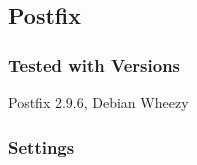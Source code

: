 \subsection{Postfix}

\subsubsection{Tested with Versions}
\begin{itemize*}
  \item Postfix 2.9.6, Debian Wheezy
\end{itemize*}


\subsubsection{Settings}






